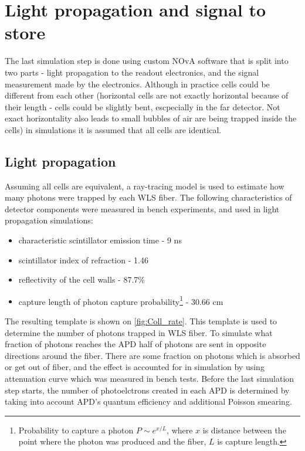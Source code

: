 \section{Light propagation and signal to store}
The last simulation step is done using custom NOvA software that is split into two parts - light
propagation to the readout electronics, and the signal measurement made by the electronics. Although in practice cells could 
be different from each other (horizontal cells are not exactly horizontal because of their length - cells could be
slightly bent, escpecially in the far detector. Not exact horizontality also leads to small bubbles of air are
being trapped inside the cells) in simulations it is assumed that all cells are identical.

\subsection{Light propagation}
Assuming all cells are equivalent, a ray-tracing model is used to estimate how many photons were trapped by
each WLS fiber. The following characteristics of detector components were measured in bench experiments, and
used in light propagation simulations:
\begin{itemize}
\item characteristic scintillator emission time - 9 ns
\item scintillator index of refraction - 1.46
\item reflectivity of the cell walls - 87.7\%
\item capture length of photon capture probability\footnote{Probability to capture a photon $P \sim e^{x/L}$, where
$x$ is distance between the point where the photon was produced and the fiber, $L$ is capture length.} - 30.66 cm
\end{itemize}
The resulting template is shown on \ref{fig:Coll_rate}. This template is used to determine the number of photons 
trapped in WLS fiber. To simulate what fraction of photons reaches the APD
half of photons are sent in opposite directions around the fiber. There are some fraction on photons which is 
absorbed or get out of fiber, and the effect is accounted for in simulation by using attenuation curve which was 
measured in bench tests. Before the last simulation step starts, the number of photoelctrons created in each APD
is determined by taking into account APD's quantum efficiency and additional Poisson smearing.
